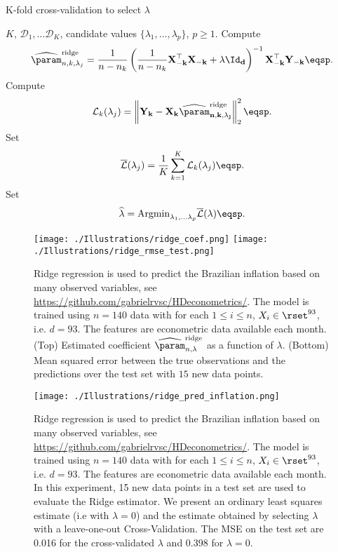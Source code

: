 \begin{algorithm}
\caption{K-fold cross-validation to select $\lambda$}\label{alg:cv:ridge}
\begin{algorithmic}
\Require $K$, $\mathcal{D}_1, \ldots \mathcal{D}_K$, candidate values $\{\lambda_1,\ldots,\lambda_p\}$, $p\geqslant 1$.
    \State Compute
$$
\widehat \param^{\mathrm{ridge}}_{n,k,\lambda_j} = \frac{1}{n-n_k}\left(\frac{1}{n-n_k}\bf{X}_{-k}^\top \bf{X}_{-k} + \lambda \Id_d\right)^{-1}\bf{X}_{-k}^\top \bf{Y}_{-k}\eqsp.
$$
    \State Compute
$$
\mathcal{L}_k(\lambda_j) = \left\|\bf{Y}_k - \bf{X}_k \widehat \param^{\mathrm{ridge}}_{n,k,\lambda_j}\right\|_2^2\eqsp.
$$ 
\EndFor
\State Set
$$
\overline{\mathcal{L}}(\lambda_j) = \frac{1}{K}\sum_{k=1}^{K}\mathcal{L}_k(\lambda_j)\eqsp.
$$
\EndFor
\State Set
$$
\widehat \lambda = \mathrm{Argmin}_{\lambda_1,\ldots\lambda_p}\overline{\mathcal{L}}(\lambda)\eqsp.
$$
\end{algorithmic}
\end{algorithm}
\begin{figure}
\begin{center}
\texttt{[image: ./Illustrations/ridge\_coef.png]}
\texttt{[image: ./Illustrations/ridge\_rmse\_test.png]}
\end{center}
\caption{Ridge regression is used to predict the Brazilian inflation based on many observed variables, see \url{https://github.com/gabrielrvsc/HDeconometrics/}. The model is trained using $n=140$ data with for each $1\leqslant i \leqslant n$, $X_i\in\rset^{93}$, i.e. $d  =93$. The features are econometric data available each month. (Top) Estimated coefficient $\widehat \param^{\mathrm{ridge}}_{n,\lambda}$ as a function of $\lambda$. (Bottom) Mean squared error between the true observations and the predictions over the test set with $15$ new data points.}
\end{figure}


\begin{figure}
\begin{center}
\texttt{[image: ./Illustrations/ridge\_pred\_inflation.png]}
\end{center}
\caption{Ridge regression is used to predict the Brazilian inflation based on many observed variables, see \url{https://github.com/gabrielrvsc/HDeconometrics/}. The model is trained using $n=140$ data with for each $1\leqslant i \leqslant n$, $X_i\in\rset^{93}$, i.e. $d  =93$. The features are econometric data available each month. In this experiment, 15 new data points in a test set are used to evaluate the Ridge estimator. We present an ordinary least squares estimate (i.e with $\lambda = 0$) and the estimate obtained by selecting $\lambda$ with a leave-one-out Cross-Validation. The MSE on the test set are 0.016 for the cross-validated $\lambda$ and 0.398 for $\lambda = 0$.}
\end{figure}



